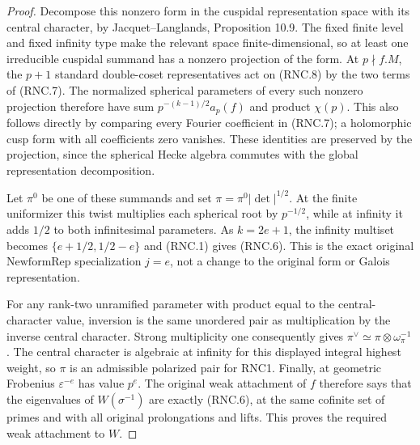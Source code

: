 \begin{proof}
Decompose this nonzero form in the cuspidal representation space
with its central character, by Jacquet--Langlands,
Proposition 10.9.  The fixed finite level and fixed infinity
type make the relevant space finite-dimensional, so at least
one irreducible cuspidal summand has a nonzero projection of
the form.  At $p\nmid f.M$, the $p+1$ standard double-coset
representatives act on (RNC.8) by the two terms of (RNC.7).
The normalized spherical parameters of every such nonzero
projection therefore have sum $p^{-(k-1)/2}a_p(f)$ and product
$\chi(p)$.  This also follows directly by comparing every
Fourier coefficient in (RNC.7); a holomorphic cusp form with
all coefficients zero vanishes.  These identities are preserved
by the projection, since the spherical Hecke algebra commutes
with the global representation decomposition.

Let $\pi^0$ be one of these summands and set
$\pi=\pi^0|\det|^{1/2}$.  At the finite uniformizer this twist
multiplies each spherical root by $p^{-1/2}$, while at infinity
it adds $1/2$ to both infinitesimal parameters.  As $k=2e+1$,
the infinity multiset becomes $\{e+1/2,1/2-e\}$ and (RNC.1)
gives (RNC.6).  This is the exact original
$\mathrm{NewformRep}$ specialization $j=e$, not a change to
the original form or Galois representation.

For any rank-two unramified parameter with product equal to
the central-character value, inversion is the same unordered
pair as multiplication by the inverse central character.
Strong multiplicity one consequently gives
$\pi^\vee\simeq\pi\otimes\omega_\pi^{-1}$.
The central character is algebraic at infinity for this
displayed integral highest weight, so $\pi$ is an admissible
polarized pair for RNC1.  Finally, at geometric Frobenius
$\varepsilon^{-e}$ has value $p^e$.  The original weak
attachment of $f$ therefore says that the eigenvalues of
$W(\sigma^{-1})$ are exactly (RNC.6), at the same cofinite
set of primes and with all original prolongations and lifts.
This proves the required weak attachment to $W$.
\end{proof}

